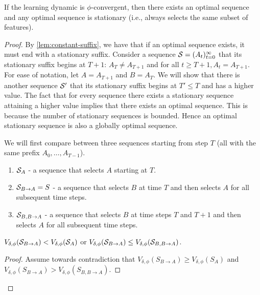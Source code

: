 \begin{theorem} \label{thm:stationary}
	If the learning dynamic is $\phi$-convergent, then there exists an optimal sequence and any optimal sequence is stationary (i.e.,  always selects the same subset of features). 
\end{theorem}
\begin{proof}
By \cref{lem:constant-suffix}, we have that 
if an optimal sequence exists, it must end with a stationary suffix. Consider a sequence $\mathcal{S}=(A_t)_{t=0}^\infty$ that its stationary suffix begins at $T+1$: $A_T \neq {A_{T+1}}$ and for all $t\geq T+1, A_t = A_{T+1}$. For ease of notation, let $A=A_{T+1}$ and $B=A_{T}$. We will show that there is another sequence $\mathcal{S}'$ that its stationary suffix begins at $T' \leq T$ and has a higher value. The fact that for every sequence there exists a stationary sequence attaining a higher value implies that there exists an optimal sequence. This is because the number of stationary sequences is bounded. Hence an optimal stationary sequence is also a globally optimal sequence.

We will first compare between three sequences starting from step $T$ (all with the same prefix $A_0,\ldots,A_{T-1}$).

	\begin{enumerate}
		\item $\mathcal{S}_A$ - a sequence that selects $A$ starting at $T$.
		\item $\mathcal{S}_{B \rightarrow A} = S$ - a sequence that selects $B$ at time $T$ and then selects $A$ for all subsequent time steps. 
		\item $\mathcal{S}_{B,B\rightarrow A}$ - a sequence that selects $B$ at time steps $T$ and $T+1$ and then selects $A$ for all subsequent time steps.
	\end{enumerate}
    \begin{lemma} \label{lem:3-comp}
        $V_{\delta,\phi}(\mathcal{S}_{B \rightarrow A}) < V_{\delta,\phi}(\mathcal{S}_A)$ or $V_{\delta,\phi}(\mathcal{S}_{B \rightarrow A}) \leq V_{\delta,\phi}(\mathcal{S}_{B,B\rightarrow A})$. 
    \end{lemma}
  
    \begin{proof}
    Assume towards contradiction that $V_{\delta,\phi}(S_{B \rightarrow A}) \geq V_{\delta,\phi}(S_A)$ and $V_{\delta,\phi}(S_{B \rightarrow A}) > V_{\delta,\phi}(S_{B,B\rightarrow A})$.
	

\end{proof}
\end{proof}
